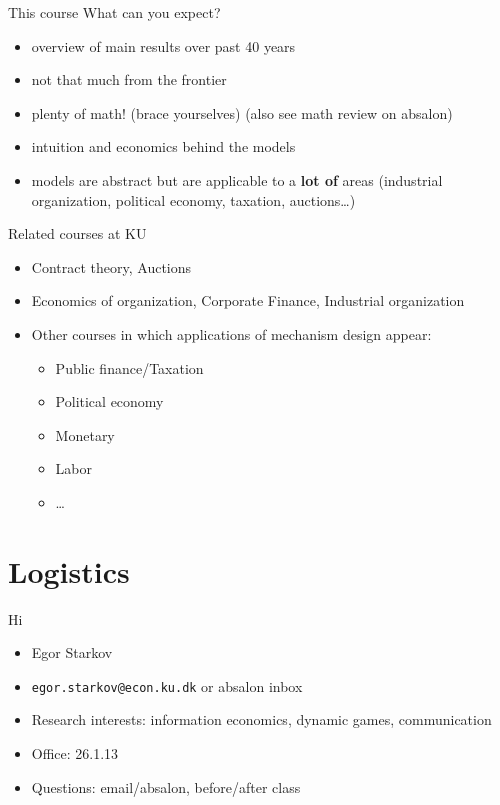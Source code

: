 \documentclass[english,10pt
,aspectratio=169
]{beamer}
\begin{document}
\begin{frame}{This course}
	What can you expect?
	\begin{itemize}
		\item overview of main results over past 40 years
		\item not that much from the frontier
		\item plenty of math! (brace yourselves) (also see math review on absalon)
		\item intuition and economics behind the models
		\item models are abstract but are applicable to a \textbf{lot of} areas (industrial organization, political economy, taxation, auctions\ldots{})
	\end{itemize}
\end{frame}


\begin{frame}{Related courses at KU}
\begin{itemize}
	\item Contract theory, Auctions
	\item Economics of organization, Corporate Finance, Industrial organization
	\item Other courses in which applications of mechanism design appear:
	\begin{itemize}
		\item Public finance/Taxation
		\item Political economy
		\item Monetary
		\item Labor
		\item \ldots{}
	\end{itemize}
\end{itemize}
\end{frame}





\section{Logistics}

\begin{frame}{Hi}
\begin{itemize}
	\item Egor Starkov
	\item \texttt{egor.starkov@econ.ku.dk} or absalon inbox
	\item Research interests: information economics, dynamic games, communication
	\item Office: 26.1.13
	\item Questions: email/absalon, before/after class
\end{itemize}
\end{frame}
\end{document}
